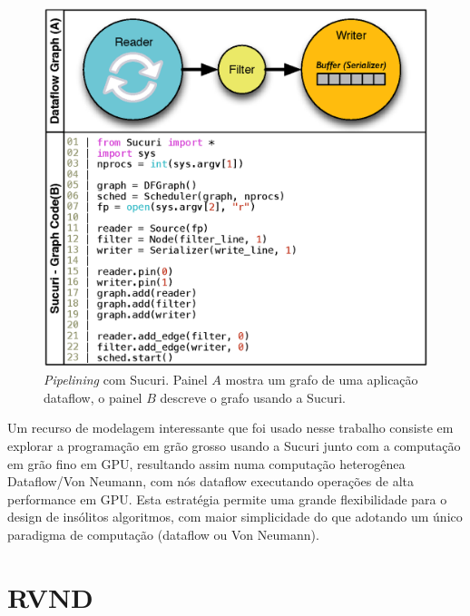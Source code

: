\begin{figure}[htbp]
    \centering
    \includegraphics[scale=0.75]{figuras/dataflow/pipeline.eps} 
    \caption{\emph{Pipelining} com Sucuri. 
    Painel $A$ mostra um grafo de uma aplicação dataflow, o painel $B$ descreve o grafo usando a Sucuri.}
    \label{fig:pipeline}
\end{figure}

Um recurso de modelagem interessante que foi usado nesse trabalho consiste em explorar a programação em grão grosso usando a Sucuri junto com a computação em grão fino em GPU, resultando assim numa computação heterogênea Dataflow/Von Neumann, com nós dataflow executando operações de alta performance em GPU.
Esta estratégia permite uma grande flexibilidade para o design de insólitos algoritmos, com maior simplicidade do que adotando um único paradigma de computação (dataflow ou Von Neumann).

\section{RVND} \label{sec:rvndClassico}

